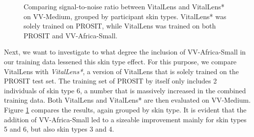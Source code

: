 \documentclass{article}
\begin{document}
\begin{figure}[h!]
  \centering
  \caption{Comparing signal-to-noise ratio between VitalLens and VitalLens* on VV-Medium, grouped by participant skin types. VitalLens* was solely trained on PROSIT, while VitalLens was trained on both PROSIT and VV-Africa-Small.}
  \label{fig:impact-skin-type-comparison}
\end{figure}

Next, we want to investigate to what degree the inclusion of VV-Africa-Small in our training data lessened this skin type effect.
For this purpose, we compare VitalLens with \textit{VitalLens*}, a version of VitalLens that is solely trained on the PROSIT test set.
The training set of PROSIT by itself only includes 2 individuals of skin type 6, a number that is massively increased in the combined training data.
Both VitalLens and VitalLens* are then evaluated on VV-Medium.
Figure \ref{fig:impact-skin-type-comparison} compares the results, again grouped by skin type.
It is evident that the addition of VV-Africa-Small led to a sizeable improvement mainly for skin types 5 and 6, but also skin types 3 and 4.
\end{document}

